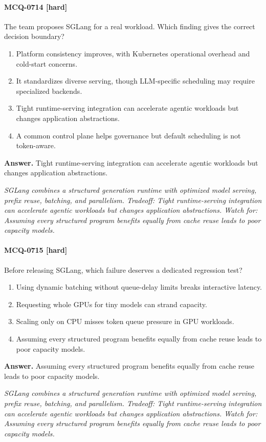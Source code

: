 \paragraph{MCQ-0714 [hard]} The team proposes SGLang for a real workload. Which finding gives the correct decision boundary?
\begin{enumerate}[label=\Alph*.]
\item Platform consistency improves, with Kubernetes operational overhead and cold-start concerns.
\item It standardizes diverse serving, though LLM-specific scheduling may require specialized backends.
\item Tight runtime-serving integration can accelerate agentic workloads but changes application abstractions.
\item A common control plane helps governance but default scheduling is not token-aware.
\end{enumerate}
\noindent\textbf{Answer.} Tight runtime-serving integration can accelerate agentic workloads but changes application abstractions.
\par\textit{SGLang combines a structured generation runtime with optimized model serving, prefix reuse, batching, and parallelism. Tradeoff: Tight runtime-serving integration can accelerate agentic workloads but changes application abstractions. Watch for: Assuming every structured program benefits equally from cache reuse leads to poor capacity models.}
\paragraph{MCQ-0715 [hard]} Before releasing SGLang, which failure deserves a dedicated regression test?
\begin{enumerate}[label=\Alph*.]
\item Using dynamic batching without queue-delay limits breaks interactive latency.
\item Requesting whole GPUs for tiny models can strand capacity.
\item Scaling only on CPU misses token queue pressure in GPU workloads.
\item Assuming every structured program benefits equally from cache reuse leads to poor capacity models.
\end{enumerate}
\noindent\textbf{Answer.} Assuming every structured program benefits equally from cache reuse leads to poor capacity models.
\par\textit{SGLang combines a structured generation runtime with optimized model serving, prefix reuse, batching, and parallelism. Tradeoff: Tight runtime-serving integration can accelerate agentic workloads but changes application abstractions. Watch for: Assuming every structured program benefits equally from cache reuse leads to poor capacity models.}
